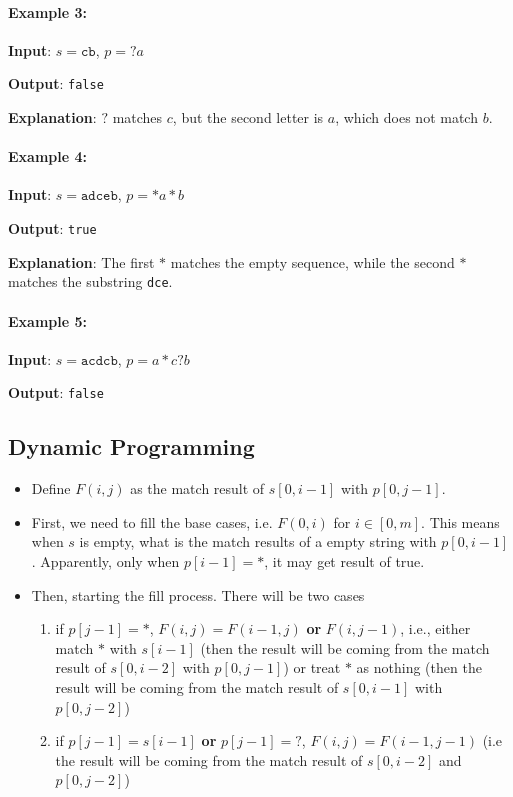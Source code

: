 \paragraph{Example 3:}

\begin{flushleft}
\textbf{Input}: $s = \texttt{cb}$, $p = ?a$

\textbf{Output}: \texttt{false}

\textbf{Explanation}: $?$ matches $c$, but the second letter is $a$, which does not match $b$.
\end{flushleft}


\paragraph{Example 4:}

\begin{flushleft}
\textbf{Input}: $s = \texttt{adceb}$, $p = \ast a\ast b$

\textbf{Output}: \texttt{true}

\textbf{Explanation}: The first $\ast$ matches the empty sequence, while the second $\ast$ matches the substring \texttt{dce}.

\end{flushleft}

\paragraph{Example 5:}

\begin{flushleft}
\textbf{Input}: $s = \texttt{acdcb}$, $p = a\ast c?b$

\textbf{Output}: \texttt{false}
\end{flushleft}

\subsection{Dynamic Programming}
\begin{itemize}
\item Define $F(i,j)$ as the match result of $s[0, i-1]$ with $p[0, j-1]$.
\item First, we need to fill the base cases, i.e. $F(0,i)$ for $i \in [0, m]$. This means when $s$ is empty, what is the match results of a empty string with $p[0, i-1]$. Apparently, only when $p[i-1] = \ast$, it may get result of true.
\item Then, starting the fill process. There will be two cases
\begin{enumerate}
\item if $p[j-1]=\ast$, $F(i,j) = F(i-1, j)$ \textbf{or} $F(i,j-1)$, i.e., either match $\ast$ with $s[i-1]$ (then the result will be coming from the match result of $s[0, i-2]$ with $p[0, j-1]$) or treat $\ast$ as nothing (then the result will be coming from the match result of $s[0,i-1]$ with $p[0,j-2]$)
\item if $p[j-1] = s[i-1]$ \textbf{or} $p[j-1] = ?$, $F(i,j) = F(i-1,j-1)$ (i.e the result will be coming from the match result of $s[0,i-2]$ and $p[0,j-2]$)
\end{enumerate}
\end{itemize}

